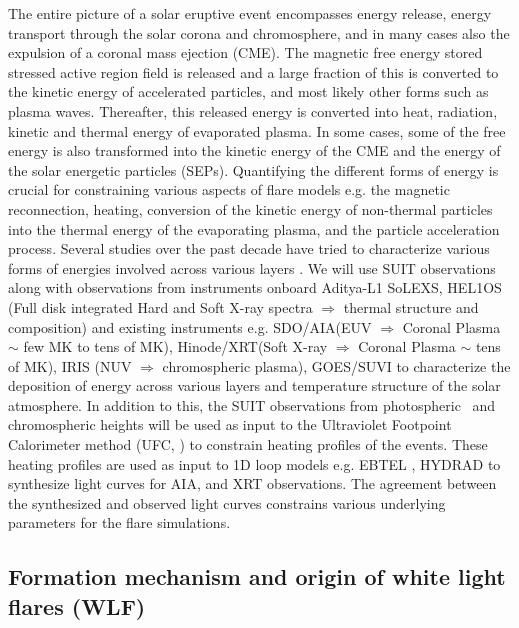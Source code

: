\documentclass{article}
\begin{document}
The entire picture of a solar eruptive event encompasses energy release, energy transport through the solar corona and chromosphere, and in many cases also the expulsion of a coronal mass ejection (CME). The magnetic free energy stored stressed active region field is released and a large fraction of this is converted to the kinetic energy of accelerated particles, and most likely other forms such as plasma waves. Thereafter, this released energy is converted into heat, radiation, kinetic and thermal energy of evaporated plasma. In some cases, some of the free energy is also transformed into the kinetic energy of the CME and the energy of the solar energetic particles (SEPs). Quantifying the different forms of energy is crucial for constraining various aspects of flare models e.g. the magnetic reconnection, heating, conversion of the kinetic energy of non-thermal particles into the thermal energy of the evaporating plasma, and the particle acceleration process. Several studies over the past decade have tried to characterize various forms of energies involved across various layers \citep{stoiser07,emslie12,inglis14,warmuth16a,warmuth16b,aschwanden17}. We will use SUIT observations along with observations from instruments onboard Aditya-L1 SoLEXS, HEL1OS (Full disk integrated Hard and Soft X-ray spectra $\Rightarrow$ thermal structure and composition) and existing instruments e.g. SDO/AIA(EUV $\Rightarrow$ Coronal Plasma $\sim$ few MK to tens of MK), Hinode/XRT(Soft X-ray $\Rightarrow$ Coronal Plasma $\sim$ tens of MK), IRIS (NUV $\Rightarrow$ chromospheric plasma), GOES/SUVI to characterize the deposition of energy across various layers and temperature structure of the solar atmosphere. In addition to this, the SUIT observations from photospheric \ and chromospheric heights will be used as input to the Ultraviolet Footpoint Calorimeter method (UFC, \citealt{qiu12,liu13}) to constrain heating profiles of the events. These heating profiles are used as input to 1D loop models e.g. EBTEL \citep{klimchuk08}, HYDRAD \citep{bradshaw13} to synthesize light curves for AIA, and XRT observations. The agreement between the synthesized and observed light curves constrains various underlying parameters for the flare simulations.

\subsection{Formation mechanism and origin of white light flares (WLF)}
\end{document}
